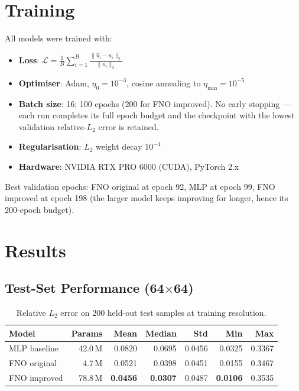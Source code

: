 \documentclass[11pt,a4paper]{article}
\begin{document}
\section{Training}

All models were trained with:
\begin{itemize}[nosep]
  \item \textbf{Loss}: $\mathcal{L} = \frac{1}{B}\sum_{i=1}^B \frac{\|\hat{u}_i - u_i\|_2}{\|u_i\|_2}$
  \item \textbf{Optimiser}: Adam, $\eta_0 = 10^{-3}$, cosine annealing to $\eta_{\min}=10^{-5}$
  \item \textbf{Batch size}: 16; 100 epochs (200 for FNO improved). No early stopping --- each run completes its full epoch budget and the checkpoint with the lowest validation relative-$L_2$ error is retained.
  \item \textbf{Regularisation}: $L_2$ weight decay $10^{-4}$
  \item \textbf{Hardware}: NVIDIA RTX PRO 6000 (CUDA), PyTorch 2.x
\end{itemize}

Best validation epochs: FNO original at epoch 92, MLP at epoch 99, FNO improved at epoch 198 (the larger model keeps improving for longer, hence its 200-epoch budget).

\section{Results}

\subsection{Test-Set Performance (64$\times$64)}

\begin{table}[H]
\centering
\caption{Relative $L_2$ error on 200 held-out test samples at training resolution.}
\label{tab:main}
\begin{tabular}{lrrrrrr}
\toprule
Model & Params & Mean & Median & Std & Min & Max \\
\midrule
MLP baseline & 42.0\,M & 0.0820 & 0.0695 & 0.0456 & 0.0325 & 0.3367 \\
FNO original &  4.7\,M & 0.0521 & 0.0398 & 0.0451 & 0.0155 & 0.3467 \\
FNO improved & 78.8\,M & \textbf{0.0456} & \textbf{0.0307} & 0.0487 & \textbf{0.0106} & 0.3535 \\
\bottomrule
\end{tabular}
\end{table}
\end{document}
